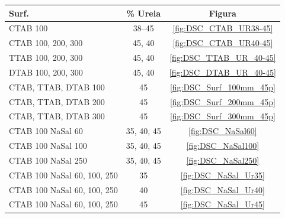        \begin{table}[h]
                {%
                \begin{tabular}{l c c}
                    \toprule
        			Surf. \mM     & \% Ureia		& Figura 			\\
        			\midrule
        			CTAB 100	  & 38--45			& \ref{fig:DSC_CTAB_UR38-45}	\\
        			CTAB 100, 200, 300	& 45, 40	& \ref{fig:DSC_CTAB_UR40-45}	\\
        			TTAB 100, 200, 300	& 45, 40	& \ref{fig:DSC_TTAB_UR_40-45}	\\
        			DTAB 100, 200, 300	& 45, 40	& \ref{fig:DSC_DTAB_UR_40-45}	\\
        			CTAB, TTAB, DTAB 100	& 45	& \ref{fig:DSC_Surf_100mm_45p}	\\
        			CTAB, TTAB, DTAB 200	& 45	& \ref{fig:DSC_Surf_200mm_45p}	\\
        			CTAB, TTAB, DTAB 300	& 45	& \ref{fig:DSC_Surf_300mm_45p}	\\
        			\midrule
        			CTAB 100 NaSal 60	& 35, 40, 45	& \ref{fig:DSC_NaSal60}		\\
        			CTAB 100 NaSal 100	& 35, 40, 45	& \ref{fig:DSC_NaSal100}	\\
        			CTAB 100 NaSal 250	& 35, 40, 45	& \ref{fig:DSC_NaSal250}	\\
        			CTAB 100 NaSal 60, 100, 250 & 35 	& \ref{fig:DSC_NaSal_Ur35}  \\
        			CTAB 100 NaSal 60, 100, 250 & 40	& \ref{fig:DSC_NaSal_Ur40}  \\
        			CTAB 100 NaSal 60, 100, 250	& 45	& \ref{fig:DSC_NaSal_Ur45}  \\
        			\bottomrule
                \end{tabular}%
                }{}
        \end{table}
%
